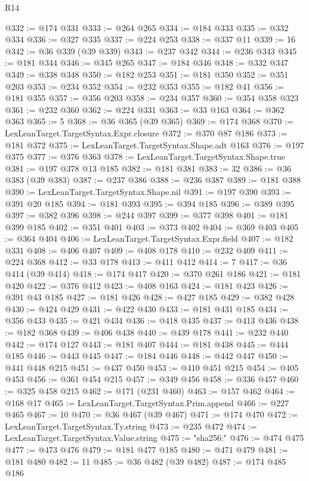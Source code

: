 \begin{lexlean}{R14}
\begin{coremodule}
@332 := @174 @331
@333 := @264 @265
@334 := @184 @333
@335 := @332 @334
@336 := @327 @335
@337 := @224 @253
@338 := @337 @11
@339 := 16
@342 := @36 @339 (@39 @339)
@343 := @237 @342
@344 := @236 @343
@345 := @181 @344
@346 := @345 @265
@347 := @184 @346
@348 := @332 @347
@349 := @338 @348
@350 := @182 @253
@351 := @181 @350
@352 := @351 @203
@353 := @234 @352
@354 := @232 @353
@355 := @182 @41
@356 := @181 @355
@357 := @356 @203
@358 := @234 @357
@360 := @354 @358 @323
@361 := @232 @360
@362 := @224 @331
@363 := @33 @163
@364 := @362 @363
@365 := 5
@368 := @36 @365 (@39 @365)
@369 := @174 @368
@370 := LexLeanTarget.TargetSyntax.Expr.closure
@372 := @370 @87 @186
@373 := @181 @372
@375 := LexLeanTarget.TargetSyntax.Shape.adt @163
@376 := @197 @375
@377 := @376 @363
@378 := LexLeanTarget.TargetSyntax.Shape.true
@381 := @197 @378 @13 @185
@382 := @181 @381
@383 := 32
@386 := @36 @383 (@39 @383)
@387 := @237 @386
@388 := @236 @387
@389 := @181 @388
@390 := LexLeanTarget.TargetSyntax.Shape.nil
@391 := @197 @390
@393 := @391 @20 @185
@394 := @181 @393
@395 := @394 @185
@396 := @389 @395
@397 := @382 @396
@398 := @244 @397
@399 := @377 @398
@401 := @181 @399 @185
@402 := @351 @401
@403 := @373 @402
@404 := @369 @403
@405 := @364 @404
@406 := LexLeanTarget.TargetSyntax.Expr.field
@407 := @182 @331
@408 := @406 @407
@409 := @408 @178
@410 := @232 @409
@411 := @224 @368
@412 := @33 @178
@413 := @411 @412
@414 := 7
@417 := @36 @414 (@39 @414)
@418 := @174 @417
@420 := @370 @261 @186
@421 := @181 @420
@422 := @376 @412
@423 := @408 @163
@424 := @181 @423
@426 := @391 @43 @185
@427 := @181 @426
@428 := @427 @185
@429 := @382 @428
@430 := @424 @429
@431 := @422 @430
@433 := @181 @431 @185
@434 := @356 @433
@435 := @421 @434
@436 := @418 @435
@437 := @413 @436
@438 := @182 @368
@439 := @406 @438
@440 := @439 @178
@441 := @232 @440
@442 := @174 @127
@443 := @181 @407
@444 := @181 @438
@445 := @444 @185
@446 := @443 @445
@447 := @184 @446
@448 := @442 @447
@450 := @441 @448 @215
@451 := @437 @450
@453 := @410 @451 @215
@454 := @405 @453
@456 := @361 @454 @215
@457 := @349 @456
@458 := @336 @457
@460 := @325 @458 @215
@462 := @171 (@231 @460)
@463 := @157 @462
@464 := @168 @17
@465 := LexLeanTarget.TargetSyntax.Prim.append
@466 := @227 @465
@467 := 10
@470 := @36 @467 (@39 @467)
@471 := @174 @470
@472 := LexLeanTarget.TargetSyntax.Ty.string
@473 := @235 @472
@474 := LexLeanTarget.TargetSyntax.Value.string
@475 := "sha256:"
@476 := @474 @475
@477 := @473 @476
@479 := @181 @477 @185
@480 := @471 @479
@481 := @181 @480
@482 := 11
@485 := @36 @482 (@39 @482)
@487 := @174 @485 @186

\end{coremodule}
\end{lexlean}
